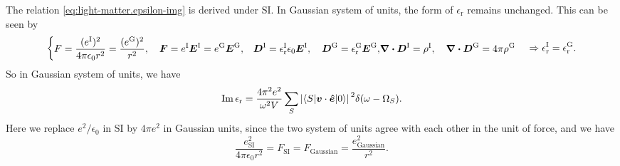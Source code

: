 \documentclass[hyperref, a4paper, 12pt]{report}
\def\\{}%
\newcommand*{\epsr}{\epsilon_{\text{r}}}
\begin{document}
The relation \eqref{eq:light-matter.epsilon-img} is derived under SI. 
In Gaussian system of units, 
the form of $\epsr$ remains unchanged. 
This can be seen by 
\[
    \left\{
        \begin{aligned}
            &F = \frac{(e^{\text{I}})^2}{4 \pi \epsilon_0 r^2} = \frac{(e^{\text{G}})^2}{r^2}, \quad 
            \vb*{F} = e^{\text{I}} \vb*{E}^{\text{I}} 
            = e^{\text{G}} \vb*{E}^{\text{G}}, \\
            &\vb*{D}^{\text{I}} = \epsr^{\text{I}} \epsilon_0 \vb*{E}^{\text{I}}, \quad 
            \vb*{D}^{\text{G}} = \epsr^{\text{G}} \vb*{E}^{\text{G}}, \\
            &\div{\vb*{D}}^{\text{I}} = \rho^{\text{I}}, \quad 
            \div{\vb*{D}}^{\text{G}} = 4\pi \rho^{\text{G}}
        \end{aligned}
    \right. \Rightarrow
    \epsr^{\text{I}} = \epsr^{\text{G}}.
\]
So in Gaussian system of units, 
we have 
\begin{equation}
    \Im \epsr = \frac{4 \pi^2 e^2}{\omega^2  V} 
        \sum_S \abs*{\mel**{S}{\vb*{v} \cdot \vu*{e}}{0}}^2 \delta(\omega - \Omega_S).
    \label{eq:light-matter.epsilon-img-2}
\end{equation}
Here we replace $e^2 / \epsilon_0$ in SI 
by $4 \pi e^2$ in Gaussian units, 
since the two system of units agree with each other 
in the unit of force, 
and we have 
\[
    \frac{e_{\text{SI}}^2}{4 \pi \epsilon_0 r^2} = F_{\text{SI}}
    = F_{\text{Gaussian}} = \frac{e_{\text{Gaussian}}^2}{r^2}.
\]
\end{document}
